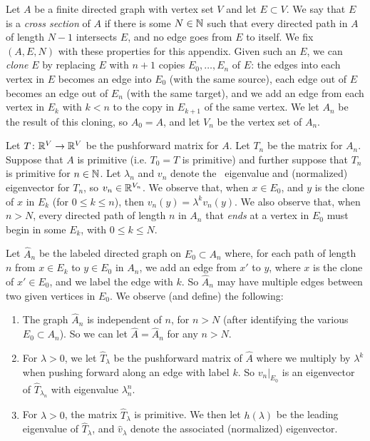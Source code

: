 \documentclass[12pt]{amsart}
\begin{document}
Let $A$ be a finite directed graph with vertex set $V$ and let $E \subset V$. 
We say that $E$ is a \emph{cross section} of $A$
 if there is some $N \in \mathbb N$ such that every directed path in $A$ of length $N-1$ intersects $E$, 
 and no edge goes from $E$ to itself. 
We fix $(A, E, N)$ with these properties for this appendix.
Given such an $E$, we can \emph{clone} $E$ by replacing $E$ with $n+1$ copies $E_0, \ldots, E_n$ of $E$: the edges into each vertex in $E$ becomes an edge into $E_0$ (with the same source), each edge out of $E$ becomes an edge out of $E_n$ (with the same target), and we add an edge from each vertex in $E_k$ with $k < n$ to the copy in $E_{k+1}$ of the same vertex. 
We let $A_n$ be the result of this cloning, so $A_0 = A$, and let $V_n$ be the vertex set of $A_n$.

Let $T\colon \mathbb R^{V} \to \mathbb R^{V}$ be the pushforward matrix for $A$. 
Let $T_n$ be the matrix for $A_n$.
Suppose that $A$ is primitive (i.e. $T_0 = T$ is primitive) and further suppose that $T_n$ is primitive for $n \in \mathbb N$. 
Let $\lambda_n$ and $v_n$ denote the \PF\ eigenvalue and (normalized) eigenvector for $T_n$, 
so $v_n \in \mathbb R^{V_n}$. 
We observe that, when $x \in E_0$, and $y$ is the clone of $x$ in $E_k$ (for $0 \le k \le n$), then $v_n(y) = \lambda^k v_n(y)$. 
We also observe that, when $n > N$, every directed path of length $n$ in $A_n$ that \emph{ends} at a vertex in $E_0$ must begin in some $E_k$, with $0 \le k \le N$. 

Let $\hat A_n$ be the labeled directed graph  on $E_0 \subset A_n$ where, for each path of length $n$ from $x \in E_k$ to $y \in E_0$ in $A_n$, we add an edge from $x'$ to  $y$, where $x$ is the clone of $x' \in E_0$, and we label the edge with $k$. So $\hat A_n$ may have multiple edges between two given vertices in $E_0$. We observe (and define) the following:
\begin{enumerate}
\item
The graph $\hat A_n$ is independent of $n$, for $n > N$ (after identifying the various $E_0 \subset A_n$). So we can let $\hat A = \hat A_n$ for any $n > N$. 
\item
For $\lambda>0$, we let $\hat T_\lambda$ be the pushforward matrix of $\hat A$ where we multiply by $\lambda^k$ when pushing forward along an edge with label $k$. 
So 
$v_n|_{E_0}$ is an eigenvector of $\hat T_{\lambda_n}$ with eigenvalue $\lambda_n^n$.
\item
For $\lambda >0$, the matrix $\hat T_\lambda$ is primitive. 
We then let $h(\lambda)$ be the leading eigenvalue of $\hat T_\lambda$, and $\hat v_\lambda$ denote the associated (normalized) eigenvector. 
\end{enumerate}
\end{document}
